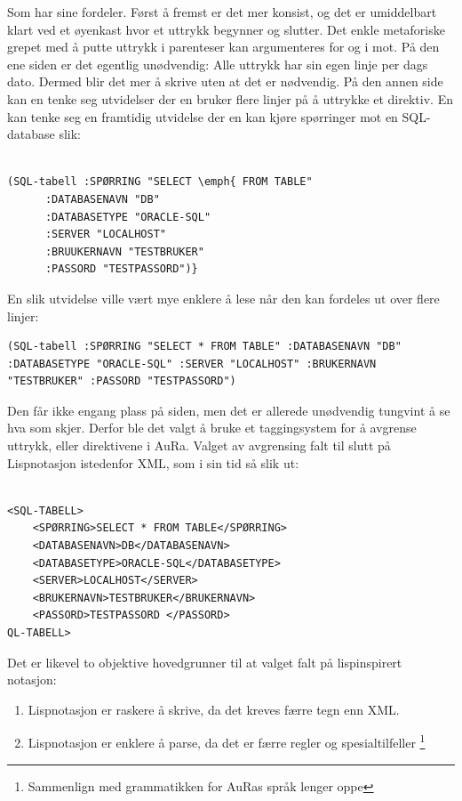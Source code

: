 \documentclass[norsk, 11pt, a4paper]{article}
\begin{document}
Som har sine fordeler. Først å fremst er det mer konsist, og det er umiddelbart klart ved et øyenkast hvor et uttrykk begynner og slutter.
Det enkle metaforiske grepet med å putte uttrykk i parenteser kan argumenteres for og i mot. På den ene siden er det egentlig unødvendig: Alle uttrykk har sin egen linje per dags dato. Dermed blir det mer å skrive uten at det er nødvendig. På den annen side kan en tenke seg utvidelser der en bruker flere linjer på å uttrykke et direktiv. En kan tenke seg en framtidig utvidelse der en kan kjøre spørringer mot en SQL-database slik:




\begin{lstlisting}

(SQL-tabell :SPØRRING "SELECT \emph{ FROM TABLE"
      :DATABASENAVN "DB"
      :DATABASETYPE "ORACLE-SQL"
      :SERVER "LOCALHOST"
      :BRUUKERNAVN "TESTBRUKER"
      :PASSORD "TESTPASSORD")}
\end{lstlisting}

En slik utvidelse ville vært mye enklere å lese når den kan fordeles ut over flere linjer:

\begin{lstlisting}
(SQL-tabell :SPØRRING "SELECT * FROM TABLE" :DATABASENAVN "DB" :DATABASETYPE "ORACLE-SQL" :SERVER "LOCALHOST" :BRUKERNAVN "TESTBRUKER" :PASSORD "TESTPASSORD")
\end{lstlisting}

Den får ikke engang plass på siden, men det er allerede unødvendig tungvint å se hva som skjer. Derfor ble det valgt å bruke et taggingsystem for å avgrense uttrykk, eller direktivene i AuRa.
Valget av avgrensing falt til slutt på Lispnotasjon istedenfor XML, som i sin tid så slik ut:

\begin{lstlisting}

<SQL-TABELL>
    <SPØRRING>SELECT * FROM TABLE</SPØRRING>
    <DATABASENAVN>DB</DATABASENAVN>
    <DATABASETYPE>ORACLE-SQL</DATABASETYPE>
    <SERVER>LOCALHOST</SERVER>
    <BRUKERNAVN>TESTBRUKER</BRUKERNAVN>
    <PASSORD>TESTPASSORD </PASSORD>
QL-TABELL>

\end{lstlisting}

Det er likevel to objektive hovedgrunner til at valget falt på lispinspirert notasjon:




\begin{enumerate}
\item Lispnotasjon er raskere å skrive, da det kreves færre tegn enn XML.
\item Lispnotasjon er enklere å parse, da det er færre regler og spesialtilfeller \footnote{Sammenlign med grammatikken for AuRas språk lenger oppe}
\end{enumerate}
\end{document}

